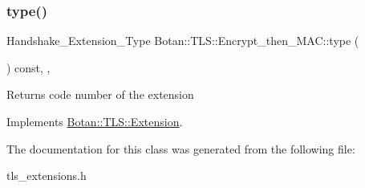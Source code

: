 \subsubsection{\texorpdfstring{type()}{type()}}
{\footnotesize\ttfamily Handshake\+\_\+\+Extension\+\_\+\+Type Botan\+::\+T\+L\+S\+::\+Encrypt\+\_\+then\+\_\+\+M\+A\+C\+::type (\begin{DoxyParamCaption}{ }\end{DoxyParamCaption}) const\hspace{0.3cm}{\ttfamily [inline]}, {\ttfamily [override]}, {\ttfamily [virtual]}}

\begin{DoxyReturn}{Returns}
code number of the extension 
\end{DoxyReturn}


Implements \hyperlink{class_botan_1_1_t_l_s_1_1_extension_ac8819b312ce604453225e7b4f7c373ec}{Botan\+::\+T\+L\+S\+::\+Extension}.



The documentation for this class was generated from the following file\+:\begin{DoxyCompactItemize}
\item 
tls\+\_\+extensions.\+h\end{DoxyCompactItemize}
